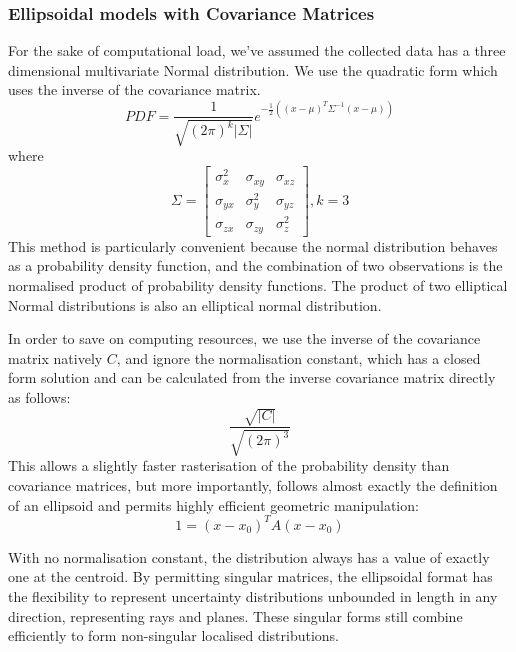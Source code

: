 \documentclass[a4paper, 11pt, titlepage]{article}
\begin{document}
    \subsubsection{Ellipsoidal models with Covariance Matrices}
      For the sake of computational load, we've assumed the collected data has a three dimensional multivariate Normal distribution.  We use the quadratic form which uses the inverse of the covariance matrix.
      \begin{equation}
      PDF = \frac{1}{\sqrt{(2\pi)^k|\Sigma|}} e^{-\frac{1}{2}\left( \left(x-\mu\right)^T \Sigma^{-1} \left(x-\mu\right) \right)}
      \end{equation}
      where
      \begin{equation}
      \Sigma=\begin{bmatrix}
        \sigma_x^2 & \sigma_{xy} & \sigma_{xz} \\[0.3em]
        \sigma_{yx} & \sigma_y^2 & \sigma_{yz} \\[0.3em]
        \sigma_{zx} & \sigma_{zy} & \sigma_z^2 
      \end{bmatrix}, k=3
      \end{equation}
      This method is particularly convenient because the normal distribution behaves as a probability density function, and the combination of two observations is the normalised product of probability density functions.  The product of two elliptical Normal distributions is also an elliptical normal distribution.

      In order to save on computing resources, we use the inverse of the covariance matrix natively \(C\), and ignore the normalisation constant, which has a closed form solution and can be calculated from the inverse covariance matrix directly as follows:
      \begin{equation}
      \frac{\sqrt{|C|}}{\sqrt{(2\pi)^3}}
      \end{equation}
      This allows a slightly faster rasterisation of the probability density than covariance matrices, but more importantly, follows almost exactly the definition of an ellipsoid and permits highly efficient geometric manipulation:
      \begin{equation}
      1 = \left(x-x_0\right)^T A \left(x-x_0\right)
      \end{equation}

      With no normalisation constant, the distribution always has a value of exactly one at the centroid.
      By permitting singular matrices, the ellipsoidal format has the flexibility to represent uncertainty distributions unbounded in length in any direction, representing rays and planes.  These singular forms still combine efficiently to form non-singular localised distributions.
      
\end{document}
